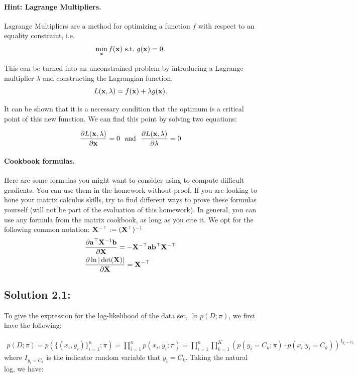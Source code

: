 \documentclass[submit]{harvardml}
\begin{document}
\begin{problem}
\paragraph{Hint: Lagrange Multipliers.} Lagrange Multipliers are a method for
optimizing a function $f$ with respect to an
equality constraint, i.e.
\[\min_{\mathbf{x}} f(\mathbf{x})\ \text{s.t.}\ g(\mathbf{x}) = 0.\]

This can be turned into an unconstrained problem by introducing a
Lagrange multiplier $\lambda$ and constructing the Lagrangian function,
\[L(\mathbf{x}, \lambda) =  f(\mathbf{x}) + \lambda g(\mathbf{x}).\]

It can be shown that it is a necessary condition that the optimum
is a critical point of this new function. We can find this point by solving two equations:

\[\frac{\partial L(\mathbf{x}, \lambda)}{\partial  \mathbf{x}} = 0  \ \ \text{and}\  \  \frac{\partial L(\mathbf{x}, \lambda)}{\partial \lambda} = 0 \]


\paragraph{Cookbook formulas.} Here are some formulas you might want to consider
using to compute difficult gradients. You can use them  in the homework
without proof. If you are looking to hone your matrix calculus skills, try to
find different ways to prove these formulas yourself (will not be part of the
evaluation of this homework). In general, you can use any formula from the matrix cookbook,
as long as you cite it. We opt for the following common notation:
$\mathbf{X}^{-\top} := (\mathbf{X}^{\top})^{-1}$
\begin{align*}
  & \frac{\partial \mathbf{a}^\top \mathbf{X}^{-1} \mathbf{b}}{\partial \mathbf{X}} = - \mathbf{X}^{-\top} \mathbf{a} \mathbf{b}^\top \mathbf{X}^{-\top} \\
  & \frac{\partial \ln | \det (\mathbf{X}) |}{\partial \mathbf{X}} = \mathbf{X}^{-\top}
 \end{align*}
 \end{problem}


\subsection*{Solution 2.1:}

To give the expression for the log-likelihood of the data set, $\ln p(D; \pi)$, we first have the following:

\begin{align*}
    p(D; \pi) = p(\{(x_i, y_i)\}_{i=1}^n; \pi) = \prod_{i=1}^n p(x_i, y_i; \pi) = \prod_{i=1}^n \prod_{k=1}^K (p(y_i = C_k; \pi) \cdot p(x_i | y_i = C_k))^{I_{y_i=C_k}}
\end{align*}
where $I_{y_i=C_k}$ is the indicator random variable that $y_i = C_k$. Taking the natural log, we have:
\end{document}
